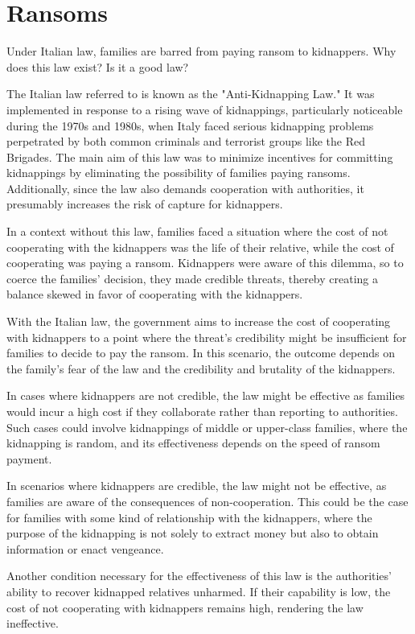 \section{Ransoms}

\begin{tcolorbox}
    Under Italian law, families are barred from paying ransom to kidnappers. Why does this law exist? Is it a good law?
\end{tcolorbox}


The Italian law referred to is known as the "Anti-Kidnapping Law." It was implemented in response to a rising wave of kidnappings, particularly noticeable during the 1970s and 1980s, when Italy faced serious kidnapping problems perpetrated by both common criminals and terrorist groups like the Red Brigades. The main aim of this law was to minimize incentives for committing kidnappings by eliminating the possibility of families paying ransoms. Additionally, since the law also demands cooperation with authorities, it presumably increases the risk of capture for kidnappers.

In a context without this law, families faced a situation where the cost of not cooperating with the kidnappers was the life of their relative, while the cost of cooperating was paying a ransom. Kidnappers were aware of this dilemma, so to coerce the families' decision, they made credible threats, thereby creating a balance skewed in favor of cooperating with the kidnappers.

With the Italian law, the government aims to increase the cost of cooperating with kidnappers to a point where the threat's credibility might be insufficient for families to decide to pay the ransom. In this scenario, the outcome depends on the family's fear of the law and the credibility and brutality of the kidnappers.

In cases where kidnappers are not credible, the law might be effective as families would incur a high cost if they collaborate rather than reporting to authorities. Such cases could involve kidnappings of middle or upper-class families, where the kidnapping is random, and its effectiveness depends on the speed of ransom payment.

In scenarios where kidnappers are credible, the law might not be effective, as families are aware of the consequences of non-cooperation. This could be the case for families with some kind of relationship with the kidnappers, where the purpose of the kidnapping is not solely to extract money but also to obtain information or enact vengeance.

Another condition necessary for the effectiveness of this law is the authorities' ability to recover kidnapped relatives unharmed. If their capability is low, the cost of not cooperating with kidnappers remains high, rendering the law ineffective.